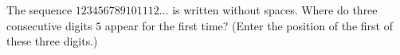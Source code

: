 The sequence $123456789101112\ldots$ is written without spaces. Where do three consecutive digits $5$ appear for the first time? (Enter the position of the first of these three digits.)

